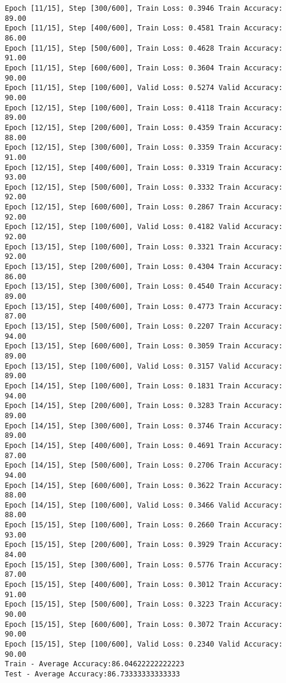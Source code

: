 \documentclass[11pt]{article}
\begin{document}
\begin{Verbatim}[commandchars=\\\{\}]
Epoch [11/15], Step [300/600], Train Loss: 0.3946 Train Accuracy: 89.00
Epoch [11/15], Step [400/600], Train Loss: 0.4581 Train Accuracy: 86.00
Epoch [11/15], Step [500/600], Train Loss: 0.4628 Train Accuracy: 91.00
Epoch [11/15], Step [600/600], Train Loss: 0.3604 Train Accuracy: 90.00
Epoch [11/15], Step [100/600], Valid Loss: 0.5274 Valid Accuracy: 90.00
Epoch [12/15], Step [100/600], Train Loss: 0.4118 Train Accuracy: 89.00
Epoch [12/15], Step [200/600], Train Loss: 0.4359 Train Accuracy: 88.00
Epoch [12/15], Step [300/600], Train Loss: 0.3359 Train Accuracy: 91.00
Epoch [12/15], Step [400/600], Train Loss: 0.3319 Train Accuracy: 93.00
Epoch [12/15], Step [500/600], Train Loss: 0.3332 Train Accuracy: 92.00
Epoch [12/15], Step [600/600], Train Loss: 0.2867 Train Accuracy: 92.00
Epoch [12/15], Step [100/600], Valid Loss: 0.4182 Valid Accuracy: 92.00
Epoch [13/15], Step [100/600], Train Loss: 0.3321 Train Accuracy: 92.00
Epoch [13/15], Step [200/600], Train Loss: 0.4304 Train Accuracy: 86.00
Epoch [13/15], Step [300/600], Train Loss: 0.4540 Train Accuracy: 89.00
Epoch [13/15], Step [400/600], Train Loss: 0.4773 Train Accuracy: 87.00
Epoch [13/15], Step [500/600], Train Loss: 0.2207 Train Accuracy: 94.00
Epoch [13/15], Step [600/600], Train Loss: 0.3059 Train Accuracy: 89.00
Epoch [13/15], Step [100/600], Valid Loss: 0.3157 Valid Accuracy: 89.00
Epoch [14/15], Step [100/600], Train Loss: 0.1831 Train Accuracy: 94.00
Epoch [14/15], Step [200/600], Train Loss: 0.3283 Train Accuracy: 89.00
Epoch [14/15], Step [300/600], Train Loss: 0.3746 Train Accuracy: 89.00
Epoch [14/15], Step [400/600], Train Loss: 0.4691 Train Accuracy: 87.00
Epoch [14/15], Step [500/600], Train Loss: 0.2706 Train Accuracy: 94.00
Epoch [14/15], Step [600/600], Train Loss: 0.3622 Train Accuracy: 88.00
Epoch [14/15], Step [100/600], Valid Loss: 0.3466 Valid Accuracy: 88.00
Epoch [15/15], Step [100/600], Train Loss: 0.2660 Train Accuracy: 93.00
Epoch [15/15], Step [200/600], Train Loss: 0.3929 Train Accuracy: 84.00
Epoch [15/15], Step [300/600], Train Loss: 0.5776 Train Accuracy: 87.00
Epoch [15/15], Step [400/600], Train Loss: 0.3012 Train Accuracy: 91.00
Epoch [15/15], Step [500/600], Train Loss: 0.3223 Train Accuracy: 90.00
Epoch [15/15], Step [600/600], Train Loss: 0.3072 Train Accuracy: 90.00
Epoch [15/15], Step [100/600], Valid Loss: 0.2340 Valid Accuracy: 90.00
Train - Average Accuracy:86.04622222222223
Test - Average Accuracy:86.73333333333333

    \end{Verbatim}
\end{document}
